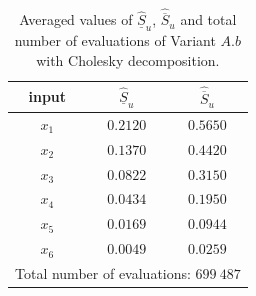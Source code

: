 \begin{table}[!ht]
\caption{Averaged values of $\widehat{\underline{S}}_u$, ${\widehat{\overline{S}}_u}$ and total number of evaluations of Variant $A.b$ with Cholesky decomposition.}
 \centering
\begin{tabular}{ccc}
\hline
 input & $\widehat{\underline{S}}_u$ & $\widehat{\overline{S}}_u$  \\ \hline
 $x_1$ & $0.2120$ & $0.5650$  \\ \hline
 $x_2$ & $0.1370$ & $0.4420$ \\ \hline
 $x_3$ & $0.0822$ & $0.3150$  \\ \hline
 $x_4$ & $0.0434$ & $0.1950$  \\ \hline
 $x_5$ & $0.0169$ & $0.0944$  \\ \hline
 $x_6$ & $0.0049$ & $0.0259$  \\ \hline \hline
\multicolumn{3}{l}{Total number of evaluations: $699 \ 487$}\\ \hline 
\end{tabular}
\label{res.AsianChol.Ab}
\end{table}
